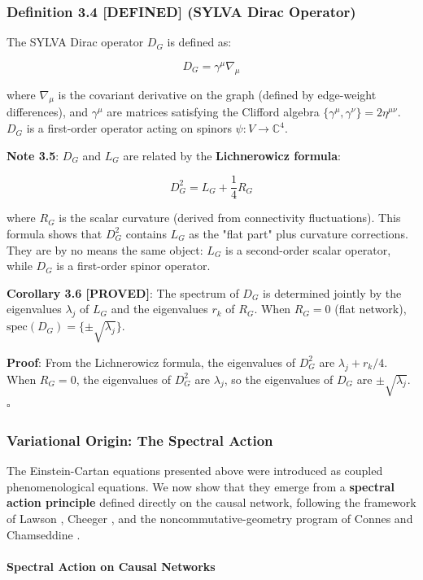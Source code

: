 \documentclass[11pt,a4paper]{article}
\theoremstyle{plain}
\theoremstyle{definition}
\begin{document}
\subsubsection{Definition 3.4 \textbf{[DEFINED]} (SYLVA Dirac Operator)}

The SYLVA Dirac operator $D_G$ is defined as:

$$D_G = \gamma^\mu \nabla_\mu$$

where $\nabla_\mu$ is the covariant derivative on the graph (defined by edge-weight differences), and $\gamma^\mu$ are matrices satisfying the Clifford algebra $\{\gamma^\mu, \gamma^\nu\} = 2\eta^{\mu\nu}$. $D_G$ is a first-order operator acting on spinors $\psi: V \to \mathbb{C}^4$.

\textbf{Note 3.5}: $D_G$ and $L_G$ are related by the \textbf{Lichnerowicz formula}:

$$D_G^2 = L_G + \frac{1}{4} R_G$$

where $R_G$ is the scalar curvature (derived from connectivity fluctuations). This formula shows that $D_G^2$ contains $L_G$ as the "flat part" plus curvature corrections. They are by no means the same object: $L_G$ is a second-order scalar operator, while $D_G$ is a first-order spinor operator.

\textbf{Corollary 3.6 \textbf{[PROVED]}}: The spectrum of $D_G$ is determined jointly by the eigenvalues $\lambda_j$ of $L_G$ and the eigenvalues $r_k$ of $R_G$. When $R_G = 0$ (flat network), $\text{spec}(D_G) = \{\pm\sqrt{\lambda_j}\}$.

\textbf{Proof}: From the Lichnerowicz formula, the eigenvalues of $D_G^2$ are $\lambda_j + r_k/4$. When $R_G = 0$, the eigenvalues of $D_G^2$ are $\lambda_j$, so the eigenvalues of $D_G$ are $\pm\sqrt{\lambda_j}$. $\square$

\subsubsection{Variational Origin: The Spectral Action}

The Einstein-Cartan equations presented above were introduced as coupled phenomenological equations. We now show that they emerge from a \textbf{spectral action principle} defined directly on the causal network, following the framework of Lawson \cite{Chomiuk2026}, Cheeger \cite{Connes1996}, and the noncommutative-geometry program of Connes and Chamseddine \cite{Ambjorn2020}.

\paragraph{Spectral Action on Causal Networks}
\end{document}
